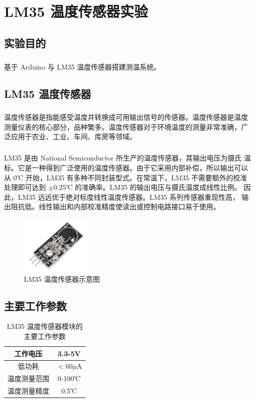 \documentclass[UTF8, oneside]{ctexbook}
\begin{document}
\chapter{LM35 温度传感器实验}
\section{实验目的}
\paragraph{}
基于 Arduino 与 LM35 温度传感器搭建测温系统。

\section{LM35 温度传感器}
\paragraph{}
温度传感器是指能感受温度并转换成可用输出信号的传感器。温度传感器是温度
测量仪表的核心部分，品种繁多。温度传感器对于环境温度的测量非常准确，广
泛应用于农业、工业、车间、库房等领域。

\paragraph{}
LM35 是由 National Semiconductor 所生产的温度传感器，其输出电压为摄氏
温标。它是一种得到广泛使用的温度传感器。由于它采用内部补偿，所以输出可以
从 0℃ 开始，LM35 有多种不同封装型式。在常温下，LM35 不需要额外的校准
处理即可达到 $\pm 0.25$℃ 的准确率。LM35 的输出电压与摄氏温度成线性比例。
因此，LM35 远远优于绝对标度线性温度传感器。LM35 系列传感器重现性高，
输出阻抗低。线性输出和内部校准精度使读出或控制电路接口易于使用。

\begin{figure}[h]
    \centering
    \includegraphics[width=0.3\textwidth]{./result/sensor/10/sensor.png}
    \caption{LM35 温度传感器示意图}
    \label{10_sensor}
\end{figure}

\section{主要工作参数}
\newpage
\begin{table}[h]
    \centering
    \begin{tabular}{|c|c|}
    \hline
    工作电压    & 3.3-5V \\ \hline
    低功耗    & $<$60$\mu$A \\ \hline
    温度测量范围 & 0-100℃   \\ \hline
    温度测量精度 & 0.5℃    \\ \hline
    \end{tabular}
    \caption{LM35 温度传感器模块的主要工作参数}
\end{table}
\end{document}
